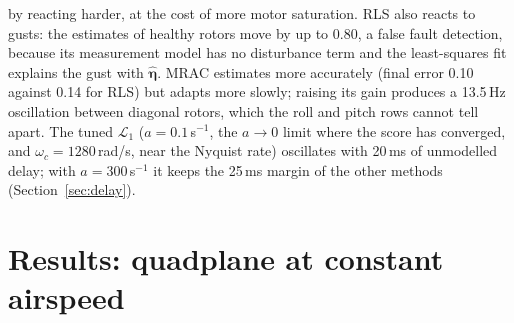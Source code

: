 \documentclass[preprint,12pt,a4paper]{elsarticle}
\newcommand{\vect}[1]{\bm{#1}}
\begin{document}
by reacting harder, at the cost of more motor saturation. RLS also reacts to gusts: the estimates of healthy rotors move by up to
0.80, a false fault detection, because its measurement model has no disturbance term and the least-squares fit explains the gust
with $\hat{\vect\eta}$. MRAC estimates more accurately (final error 0.10 against 0.14 for RLS) but adapts more slowly; raising its gain
produces a 13.5\,Hz oscillation between diagonal rotors, which the roll and pitch rows cannot tell apart. The tuned $\mathcal{L}_1$
($a = 0.1$\,s$^{-1}$, the $a \to 0$ limit where the score has converged, and $\omega_c = 1280$\,rad/s, near the Nyquist rate) oscillates with
20\,ms of unmodelled delay; with $a = 300$\,s$^{-1}$ it keeps the 25\,ms margin of the other methods (Section~\ref{sec:delay}).

\section{Results: quadplane at constant airspeed}
\end{document}
